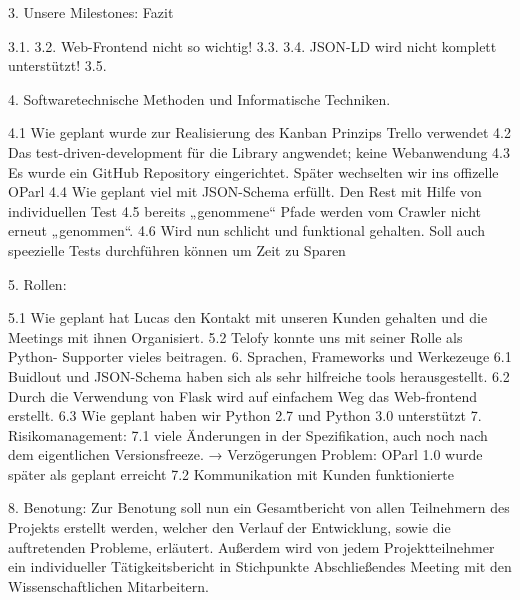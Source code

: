 \documentclass{beamer}
\begin{document}
{3. Unsere Milestones: Fazit

3.1.
3.2. Web-Frontend nicht so wichtig! 
3.3.
3.4. JSON-LD wird nicht komplett unterstützt!
3.5.

4. Softwaretechnische Methoden und Informatische Techniken.

4.1 Wie geplant wurde zur Realisierung des Kanban Prinzips Trello verwendet
4.2 Das test-driven-development für die Library angwendet; keine Webanwendung
4.3 Es wurde ein GitHub Repository eingerichtet. Später wechselten wir ins offizelle OParl
4.4 Wie geplant viel mit JSON-Schema erfüllt. Den Rest mit Hilfe von individuellen Test
4.5 bereits „genommene“ Pfade werden vom Crawler nicht erneut „genommen“.
4.6 Wird nun schlicht und funktional gehalten. Soll auch speezielle Tests durchführen können um Zeit zu Sparen

5. Rollen:

5.1 Wie geplant hat Lucas den Kontakt mit unseren Kunden gehalten und die Meetings mit ihnen Organisiert.
5.2 Telofy konnte uns mit seiner Rolle als Python- Supporter vieles beitragen.
6. Sprachen, Frameworks und Werkezeuge
6.1 Buidlout und JSON-Schema haben sich als sehr hilfreiche tools herausgestellt.
6.2 Durch die Verwendung von Flask wird auf einfachem Weg das Web-frontend erstellt.
6.3 Wie geplant haben wir Python 2.7 und Python 3.0 unterstützt
7. Risikomanagement:
7.1 viele Änderungen in der Spezifikation, auch noch nach dem eigentlichen Versionsfreeze. 
→ Verzögerungen Problem: OParl 1.0 wurde später als geplant erreicht
7.2  Kommunikation mit Kunden funktionierte

8. Benotung:
 Zur Benotung soll nun ein Gesamtbericht von allen Teilnehmern des Projekts erstellt werden, welcher den Verlauf der Entwicklung, sowie die auftretenden Probleme, erläutert. Außerdem wird von jedem Projektteilnehmer ein individueller Tätigkeitsbericht in Stichpunkte
Abschließendes Meeting mit den Wissenschaftlichen Mitarbeitern. 




}

\end{document}
